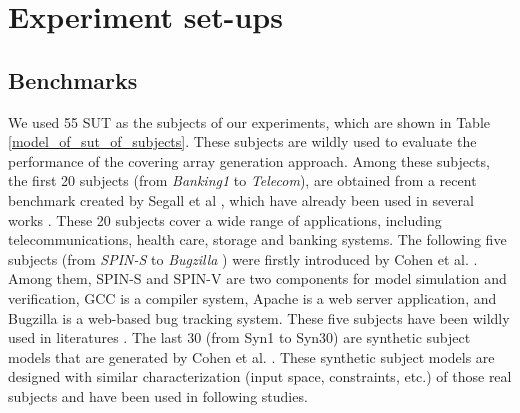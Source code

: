 \documentclass[conference]{IEEEtran}
\theoremstyle{definition}
\begin{document}
%


\section{Experiment set-ups}

\subsection{Benchmarks}
We used 55 SUT as the subjects of our experiments, which are shown in Table \ref{model_of_sut_of_subjects}. These subjects are wildly used to evaluate the performance of the covering array generation approach. Among these subjects, the first 20 subjects (from \emph{Banking1} to \emph{Telecom}), are obtained from a recent benchmark created by Segall et al \cite{segall2011using}, which have already been used in several works \cite{jia2015learning,choi2016distance}. These 20 subjects cover a wide range of applications, including telecommunications, health care, storage and banking systems.  The following five subjects (from \emph{SPIN-S}  to \emph{Bugzilla} ) were firstly introduced by Cohen et al. \cite{cohen2007interaction,cohen2008constructing}. Among them, SPIN-S and SPIN-V are two components for model simulation and verification, GCC is a compiler system, Apache is a web server application, and Bugzilla is a web-based bug tracking system. These five subjects have been wildly used in literatures \cite{kuhn2006pseudo,cohen2007interaction,cohen2008constructing,garvin2009improved,garvin2011evaluating,lin2015tca,choi2016distance}. The last 30 (from Syn1 to Syn30) are synthetic subject models that are generated by Cohen et al. \cite{cohen2008constructing}. These synthetic subject models are designed with similar characterization (input space, constraints, etc.) of those real subjects and have been used in following studies\cite{garvin2009improved,garvin2011evaluating,lin2015tca,choi2016distance}.
\end{document}
